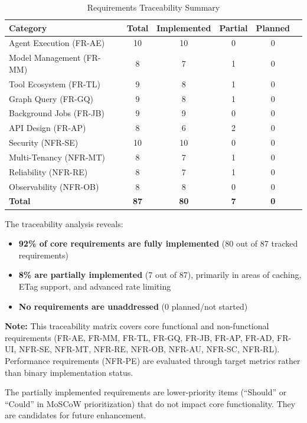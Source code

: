 \documentclass[a4paper,twoside]{sapthesis}
\begin{document}
\begin{table}[htbp]
\centering
\caption{Requirements Traceability Summary}
\label{tab:trace-summary}
\begin{tabular}{lccccc}
\toprule
\textbf{Category} & \textbf{Total} & \textbf{Implemented} & \textbf{Partial} & \textbf{Planned} \\
\midrule
Agent Execution (FR-AE) & 10 & 10 & 0 & 0 \\
\midrule
Model Management (FR-MM) & 8 & 7 & 1 & 0 \\
\midrule
Tool Ecosystem (FR-TL) & 9 & 8 & 1 & 0 \\
\midrule
Graph Query (FR-GQ) & 9 & 8 & 1 & 0 \\
\midrule
Background Jobs (FR-JB) & 9 & 9 & 0 & 0 \\
\midrule
API Design (FR-AP) & 8 & 6 & 2 & 0 \\
\midrule
Security (NFR-SE) & 10 & 10 & 0 & 0 \\
\midrule
Multi-Tenancy (NFR-MT) & 8 & 7 & 1 & 0 \\
\midrule
Reliability (NFR-RE) & 8 & 7 & 1 & 0 \\
\midrule
Observability (NFR-OB) & 8 & 8 & 0 & 0 \\
\midrule
\textbf{Total} & \textbf{87} & \textbf{80} & \textbf{7} & \textbf{0} \\
\bottomrule
\end{tabular}
\end{table}

The traceability analysis reveals:
\begin{itemize}
    \item \textbf{92\% of core requirements are fully implemented} (80 out of 87 tracked requirements)
    \item \textbf{8\% are partially implemented} (7 out of 87), primarily in areas of caching, ETag support, and advanced rate limiting
    \item \textbf{No requirements are unaddressed} (0 planned/not started)
\end{itemize}

\textbf{Note:} This traceability matrix covers core functional and non-functional requirements (FR-AE, FR-MM, FR-TL, FR-GQ, FR-JB, FR-AP, FR-AD, FR-UI, NFR-SE, NFR-MT, NFR-RE, NFR-OB, NFR-AU, NFR-SC, NFR-RL). Performance requirements (NFR-PE) are evaluated through target metrics rather than binary implementation status.

The partially implemented requirements are lower-priority items (``Should'' or ``Could'' in MoSCoW prioritization) that do not impact core functionality. They are candidates for future enhancement.
\end{document}
